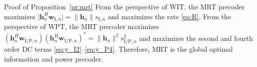 \documentclass[journal]{IEEEtran}
\begin{document}
\begin{appendix}
		\begin{subsection}{Proof of Proposition~\ref{pr:mrt}}\label{ap:mrt}
			From the perspective of WIT, the MRT precoder maximizes $\lvert{\boldsymbol{h}_{n}^H \boldsymbol{w}_{\mathrm{I}, n}}\rvert = \lVert{\boldsymbol{h}_{n}}\rVert s_{\mathrm{I}, n}$ and maximizes the rate \eqref{eq:R}. From the perspective of WPT, the MRT precoder maximizes $(\boldsymbol{h}_{n}^H \boldsymbol{w}_{\mathrm{I/P}, n})(\boldsymbol{h}_{n}^H \boldsymbol{w}_{\mathrm{I/P}, n})^* = \lVert{\boldsymbol{h}_{n}}\rVert^2 s_{\mathrm{I/P}, n}^2$ and maximizes the second and fourth order DC terms \eqref{eq:y_I2}--\eqref{eq:y_P4}. Therefore, MRT is the global optimal information and power precoder.
		\end{subsection}
	\end{appendix}

	
	
\end{document}
